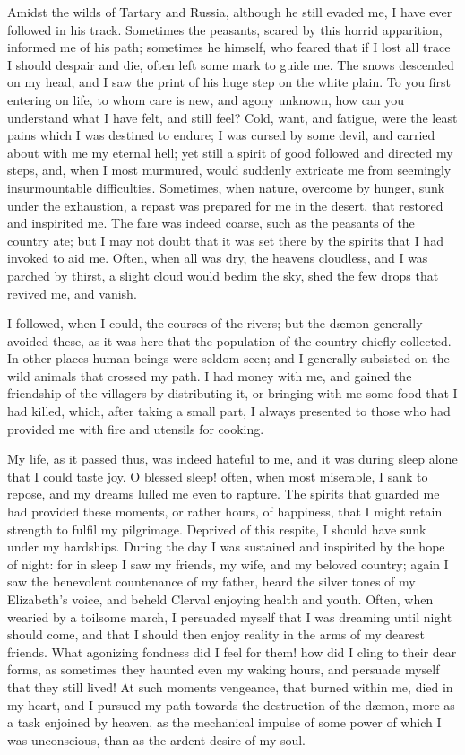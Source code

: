 Amidst the wilds of Tartary and
Russia, although he still evaded me,
I have ever followed in his track.
Sometimes the peasants, scared by this
horrid apparition, informed me of his
path; sometimes he himself, who feared
that if I lost all trace I should despair
and die, often left some mark to guide
me. The snows descended on my
head, and I saw the print of his huge
step on the white plain. To you first
entering on life, to whom care is new,
and agony unknown, how can you understand
what I have felt, and still feel?
Cold, want, and fatigue, were the least
pains which I was destined to endure;
I was cursed by some devil, and carried
about with me my eternal hell; yet
still a spirit of good followed and
directed my steps, and, when I most
murmured, would suddenly extricate
me from seemingly insurmountable
difficulties. Sometimes, when nature,
overcome by hunger, sunk under the
exhaustion, a repast was prepared for
me in the desert, that restored and
inspirited me. The fare was indeed
coarse, such as the peasants of the
country ate; but I may not doubt that
it was set there by the spirits that I had
invoked to aid me. Often, when all
was dry, the heavens cloudless, and I
was parched by thirst, a slight cloud
would bedim the sky, shed the few
drops that revived me, and vanish.

I followed, when I could, the courses
of the rivers; but the dæmon generally
avoided these, as it was here that the
population of the country chiefly collected.
In other places human beings
were seldom seen; and I generally subsisted
on the wild animals that crossed
my path. I had money with me, and
gained the friendship of the villagers
by distributing it, or bringing with me
some food that I had killed, which, after
taking a small part, I always presented
to those who had provided me with fire
and utensils for cooking.

My life, as it passed thus, was indeed
hateful to me, and it was during sleep
alone that I could taste joy. O
blessed sleep! often, when most miserable,
I sank to repose, and my dreams
lulled me even to rapture. The spirits
that guarded me had provided these
moments, or rather hours, of happiness,
that I might retain strength to fulfil
my pilgrimage. Deprived of this respite,
I should have sunk under my
hardships. During the day I was sustained
and inspirited by the hope of
night: for in sleep I saw my friends,
my wife, and my beloved country;
again I saw the benevolent countenance
of my father, heard the silver
tones of my Elizabeth's voice, and beheld
Clerval enjoying health and youth.
Often, when wearied by a toilsome
march, I persuaded myself that I was
dreaming until night should come, and
that I should then enjoy reality in the
arms of my dearest friends. What
agonizing fondness did I feel for them!
how did I cling to their dear forms, as
sometimes they haunted even my waking
hours, and persuade myself that they
still lived! At such moments
vengeance, that burned within me, died
in my heart, and I pursued my path
towards the destruction of the dæmon,
more as a task enjoined by heaven, as
the mechanical impulse of some power
of which I was unconscious, than as the
ardent desire of my soul.

